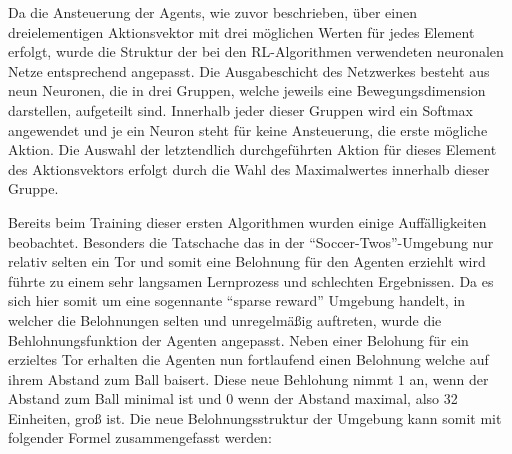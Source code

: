 \documentclass[twocolumn]{webofc}
\begin{document}

Da die Ansteuerung der Agents, wie zuvor beschrieben, über einen dreielementigen Aktionsvektor mit drei möglichen Werten für jedes Element erfolgt, wurde die Struktur der bei den \ac{RL}-Algorithmen verwendeten neuronalen Netze entsprechend angepasst. Die Ausgabeschicht des Netzwerkes besteht aus neun Neuronen, die in drei Gruppen, welche jeweils eine Bewegungsdimension darstellen, aufgeteilt sind. Innerhalb jeder dieser Gruppen wird ein Softmax angewendet und je ein Neuron steht für keine Ansteuerung, die erste mögliche Aktion. Die Auswahl der letztendlich durchgeführten Aktion für dieses Element des Aktionsvektors erfolgt durch die Wahl des Maximalwertes innerhalb dieser Gruppe.


Bereits beim Training dieser ersten Algorithmen wurden einige Auffälligkeiten beobachtet. Besonders die Tatschache das in der \enquote{Soccer-Twos}-Umgebung nur relativ selten ein Tor und somit eine Belohnung für den Agenten erziehlt wird führte zu einem sehr langsamen Lernprozess und schlechten Ergebnissen. Da es sich hier somit um eine sogennante \enquote{sparse reward} Umgebung handelt, in welcher die Belohnungen selten und unregelmäßig auftreten, wurde die Behlohnungsfunktion der Agenten angepasst. Neben einer Belohung für ein erzieltes Tor erhalten die Agenten nun fortlaufend einen Belohnung welche auf ihrem Abstand zum Ball baisert. Diese neue Behlohung nimmt \(1\) an, wenn der Abstand zum Ball minimal ist und \(0\) wenn der Abstand maximal, also 32 Einheiten, groß ist. Die neue Belohnungsstruktur der Umgebung kann somit mit folgender Formel zusammengefasst werden:

\end{document}

